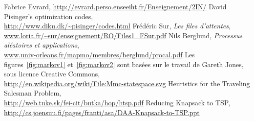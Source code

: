   Fabrice Evrard, \url{http://evrard.perso.enseeiht.fr/Enseignement/2IN/}
  David Pisinger's optimization codes,\\
  \url{http://www.diku.dk/~pisinger/codes.html}
  Frédéric Sur, \emph{Les files d'attentes}, \\
  \url{www.loria.fr/~sur/enseignement/RO/Files1_FSur.pdf}
  Nils Berglund, \emph{Processus aléatoires et applications}, \\
  \url{www.univ-orleans.fr/mapmo/membres/berglund/procal.pdf}
  Les figures~\ref{fig:markov1} et~\ref{fig:markov2} sont basées sur le travail
  de Gareth Jones, sous licence Creative Commons,\\
  \url{http://en.wikipedia.org/wiki/File:Mmc-statespace.svg}
   Heuristics for the Traveling Salesman Problem,\\
   \url{http://web.tuke.sk/fei-cit/butka/hop/htsp.pdf}
   Reducing Knapsack to TSP,\\
   \url{http://cs.joensuu.fi/pages/franti/asa/DAA-Knapsack-to-TSP.ppt}
